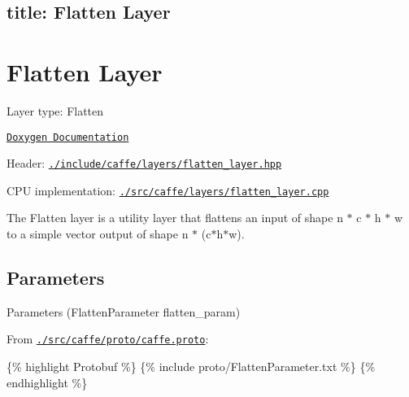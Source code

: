 

 \subsection*{title\+: Flatten Layer }

\section*{Flatten Layer}


\begin{DoxyItemize}
\item Layer type\+: {\ttfamily Flatten}
\item \href{http://caffe.berkeleyvision.org/doxygen/classcaffe_1_1FlattenLayer.html}{\tt Doxygen Documentation}
\item Header\+: \href{https://github.com/BVLC/caffe/blob/master/include/caffe/layers/flatten_layer.hpp}{\tt {\ttfamily ./include/caffe/layers/flatten\+\_\+layer.hpp}}
\item C\+PU implementation\+: \href{https://github.com/BVLC/caffe/blob/master/src/caffe/layers/flatten_layer.cpp}{\tt {\ttfamily ./src/caffe/layers/flatten\+\_\+layer.cpp}}
\end{DoxyItemize}

The {\ttfamily Flatten} layer is a utility layer that flattens an input of shape {\ttfamily n $\ast$ c $\ast$ h $\ast$ w} to a simple vector output of shape {\ttfamily n $\ast$ (c$\ast$h$\ast$w)}.

\subsection*{Parameters}


\begin{DoxyItemize}
\item Parameters ({\ttfamily Flatten\+Parameter flatten\+\_\+param})
\item From \href{https://github.com/BVLC/caffe/blob/master/src/caffe/proto/caffe.proto}{\tt {\ttfamily ./src/caffe/proto/caffe.proto}}\+:
\end{DoxyItemize}

\{\% highlight Protobuf \%\} \{\% include proto/\+Flatten\+Parameter.\+txt \%\} \{\% endhighlight \%\} 